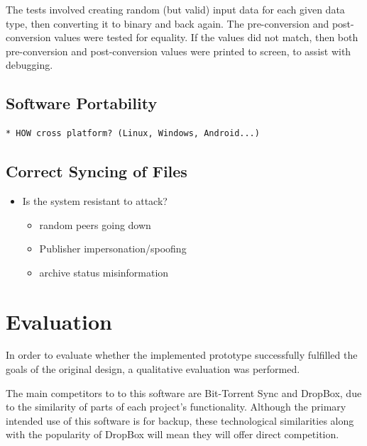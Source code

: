 \documentclass[12pt,a4paper,]{adreport}
\begin{document}
The tests involved creating random (but valid) input data for each given
data type, then converting it to binary and back again. The
pre-conversion and post-conversion values were tested for equality. If
the values did not match, then both pre-conversion and post-conversion
values were printed to screen, to assist with debugging.

\section{Software Portability}\label{software-portability}

\begin{verbatim}
* HOW cross platform? (Linux, Windows, Android...)
\end{verbatim}

\section{Correct Syncing of Files}\label{correct-syncing-of-files}

\begin{itemize}
\itemsep1pt\parskip0pt
\item
  Is the system resistant to attack?

  \begin{itemize}
  \itemsep1pt\parskip0pt
  \item
    random peers going down
  \item
    Publisher impersonation/spoofing
  \item
    archive status misinformation
  \end{itemize}
\end{itemize}

\chapter{Evaluation}\label{evaluation}

In order to evaluate whether the implemented prototype successfully
fulfilled the goals of the original design, a qualitative evaluation was
performed.

The main competitors to to this software are Bit-Torrent Sync and
DropBox, due to the similarity of parts of each project's functionality.
Although the primary intended use of this software is for backup, these
technological similarities along with the popularity of DropBox will
mean they will offer direct competition.
\end{document}
